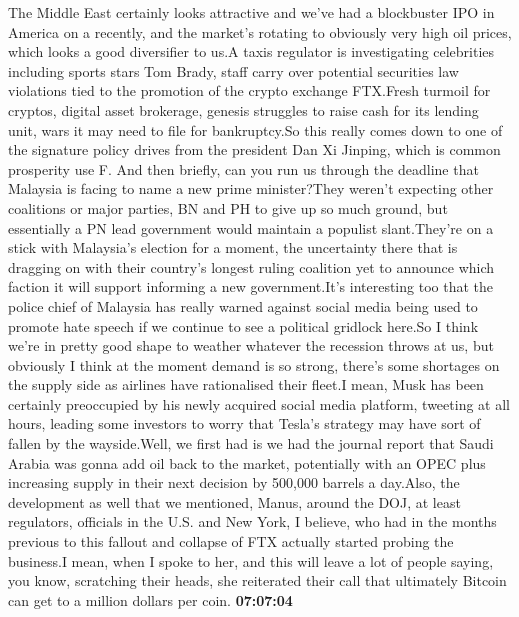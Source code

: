 \documentclass{article}%
\begin{document}
The Middle East certainly looks attractive and we've had a blockbuster IPO in America on a recently, and the market's rotating to obviously very high oil prices, which looks a good diversifier to us.A taxis regulator is investigating celebrities including sports stars Tom Brady, staff carry over potential securities law violations tied to the promotion of the crypto exchange FTX.Fresh turmoil for cryptos, digital asset brokerage, genesis struggles to raise cash for its lending unit, wars it may need to file for bankruptcy.So this really comes down to one of the signature policy drives from the president Dan Xi Jinping, which is common prosperity use F. And then briefly, can you run us through the deadline that Malaysia is facing to name a new prime minister?They weren't expecting other coalitions or major parties, BN and PH to give up so much ground, but essentially a PN lead government would maintain a populist slant.They're on a stick with Malaysia's election for a moment, the uncertainty there that is dragging on with their country's longest ruling coalition yet to announce which faction it will support informing a new government.It's interesting too that the police chief of Malaysia has really warned against social media being used to promote hate speech if we continue to see a political gridlock here.So I think we're in pretty good shape to weather whatever the recession throws at us, but obviously I think at the moment demand is so strong, there's some shortages on the supply side as airlines have rationalised their fleet.I mean, Musk has been certainly preoccupied by his newly acquired social media platform, tweeting at all hours, leading some investors to worry that Tesla's strategy may have sort of fallen by the wayside.Well, we first had is we had the journal report that Saudi Arabia was gonna add oil back to the market, potentially with an OPEC plus increasing supply in their next decision by 500,000 barrels a day.Also, the development as well that we mentioned, Manus, around the DOJ, at least regulators, officials in the U.S. and New York, I believe, who had in the months previous to this fallout and collapse of FTX actually started probing the business.I mean, when I spoke to her, and this will leave a lot of people saying, you know, scratching their heads, she reiterated their call that ultimately Bitcoin can get to a million dollars per coin.%
\textbf{07:07:04}%
\newline%
\end{document}
